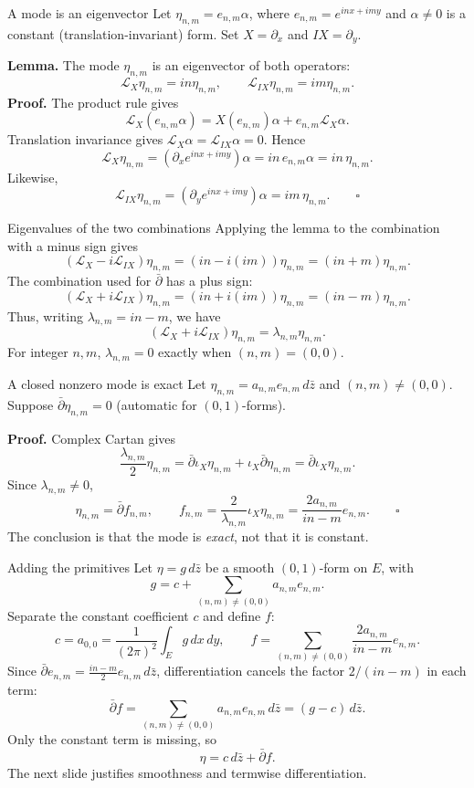 \documentclass[aspectratio=169,11pt]{beamer}
\newcommand{\db}{\bar\partial}
\newcommand{\Lie}{\mathcal L}
\newcommand{\ee}{e_{n,m}}
\begin{document}
\begin{frame}{A mode is an eigenvector}
Let $\eta_{n,m}=\ee\alpha$, where $\ee=e^{inx+imy}$ and
$\alpha\ne0$ is a constant (translation-invariant) form.
Set $X=\partial_x$ and $IX=\partial_y$.

\textbf{Lemma.} The mode $\eta_{n,m}$ is an eigenvector of both operators:
\[
 \Lie_X\eta_{n,m}=in\eta_{n,m},\qquad
 \Lie_{IX}\eta_{n,m}=im\eta_{n,m}.
\]
\textbf{Proof.} The product rule gives
\[
 \Lie_X(\ee\alpha)
 =X(\ee)\alpha+\ee\Lie_X\alpha.
\]
Translation invariance gives $\Lie_X\alpha=\Lie_{IX}\alpha=0$. Hence
\[
 \Lie_X\eta_{n,m}
 =(\partial_x e^{inx+imy})\alpha
 =in\,\ee\alpha=in\,\eta_{n,m}.
\]
Likewise,
\[
 \Lie_{IX}\eta_{n,m}
 =(\partial_y e^{inx+imy})\alpha
 =im\,\eta_{n,m}.\qquad\square
\]
\end{frame}

\begin{frame}{Eigenvalues of the two combinations}
Applying the lemma to the combination with a minus sign gives
\[
 (\Lie_X-i\Lie_{IX})\eta_{n,m}
 =(in-i(im))\eta_{n,m}=(in+m)\eta_{n,m}.
\]
The combination used for $\db$ has a plus sign:
\[
 (\Lie_X+i\Lie_{IX})\eta_{n,m}
 =(in+i(im))\eta_{n,m}=(in-m)\eta_{n,m}.
\]
Thus, writing $\lambda_{n,m}=in-m$, we have
\[
 (\Lie_X+i\Lie_{IX})\eta_{n,m}
 =\lambda_{n,m}\eta_{n,m}.
\]
For integer $n,m$, $\lambda_{n,m}=0$ exactly when $(n,m)=(0,0)$.
\end{frame}

\begin{frame}{A closed nonzero mode is exact}
Let $\eta_{n,m}=a_{n,m}\ee\,d\bar z$ and $(n,m)\ne(0,0)$.
Suppose $\db\eta_{n,m}=0$ (automatic for $(0,1)$-forms).

\textbf{Proof.} Complex Cartan gives
\[
 \frac{\lambda_{n,m}}2\eta_{n,m}
 =\db\iota_X\eta_{n,m}+\iota_X\db\eta_{n,m}
 =\db\iota_X\eta_{n,m}.
\]
Since $\lambda_{n,m}\ne0$,
\[
 \eta_{n,m}=\db f_{n,m},\qquad
 f_{n,m}=\frac{2}{\lambda_{n,m}}\iota_X\eta_{n,m}
 =\frac{2a_{n,m}}{in-m}\ee.\qquad\square
\]
The conclusion is that the mode is \emph{exact}, not that it is constant.
\end{frame}

\begin{frame}{Adding the primitives}
Let $\eta=g\,d\bar z$ be a smooth $(0,1)$-form on $E$, with
\[
 g=c+\sum_{(n,m)\ne(0,0)}a_{n,m}\ee.
\]
Separate the constant coefficient $c$ and define $f$:
\[
 c=a_{0,0}=\frac1{(2\pi)^2}\int_E g\,dx\,dy,\qquad
 f=\sum_{(n,m)\ne(0,0)}\frac{2a_{n,m}}{in-m}\ee.
\]
Since $\db\ee=\tfrac{in-m}{2}\ee\,d\bar z$,
differentiation cancels the factor $2/(in-m)$ in each term:
\[
 \db f=\sum_{(n,m)\ne(0,0)}a_{n,m}\ee\,d\bar z
 =(g-c)\,d\bar z.
\]
Only the constant term is missing, so
\[
 \boxed{\eta=c\,d\bar z+\db f.}
\]
The next slide justifies smoothness and termwise differentiation.
\end{frame}
\end{document}
